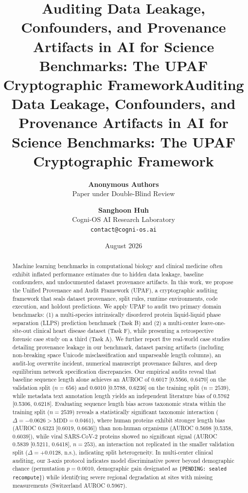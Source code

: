 \documentclass[submittal,11pt]{article}
\title{\textbf{Auditing Data Leakage, Confounders, and Provenance Artifacts in AI for Science Benchmarks: The UPAF Cryptographic Framework}}
\author{\textbf{Anonymous Authors}\\[0.5em]
  Paper under Double-Blind Review}
\title{\textbf{Auditing Data Leakage, Confounders, and Provenance Artifacts in AI for Science Benchmarks: The UPAF Cryptographic Framework}}
\author{\textbf{Sanghoon Huh}\\[0.5em]
  Cogni-OS AI Research Laboratory\\
  \texttt{contact@cogni-os.ai}}
\date{August 2026}
\begin{document}
\maketitle

\begin{abstract}
Machine learning benchmarks in computational biology and clinical medicine often exhibit inflated performance estimates due to hidden data leakage, baseline confounders, and undocumented dataset provenance artifacts. In this work, we propose the Unified Provenance and Audit Framework (UPAF), a cryptographic auditing framework that seals dataset provenance, split rules, runtime environments, code execution, and holdout predictions. We apply UPAF to audit two primary domain benchmarks: (1) a multi-species intrinsically disordered protein liquid-liquid phase separation (LLPS) prediction benchmark (Task B) and (2) a multi-center leave-one-site-out clinical heart disease dataset (Task F), while presenting a retrospective forensic case study on a third (Task A). We further report five real-world case studies detailing provenance leakage in our benchmark, dataset parsing artifacts (including non-breaking space Unicode misclassification and unparseable length columns), an audit-log overwrite incident, numerical manuscript provenance failures, and deep equilibrium network specification discrepancies. Our empirical audits reveal that baseline sequence length alone achieves an AUROC of 0.6017 [0.5566, 0.6470] on the validation split ($n=656$) and 0.6010 [0.5788, 0.6236] on the training split ($n=2539$), while metadata text annotation length yields an independent literature bias of 0.5762 [0.5306, 0.6218]. Evaluating sequence length bias across taxonomic strata within the training split ($n=2539$) reveals a statistically significant taxonomic interaction ($\Delta = -0.0626 > \text{MDD}=0.0461$), where human proteins exhibit stronger length bias (AUROC 0.6323 [0.6019, 0.6636]) than non-human organisms (AUROC 0.5698 [0.5358, 0.6039]), while viral SARS-CoV-2 proteins showed no significant signal (AUROC 0.5839 [0.5211, 0.6418], $n=253$), an interaction not replicated in the smaller validation split ($\Delta=+0.0128$, n.s.), indicating split heterogeneity. In multi-center clinical auditing, our 3-axis protocol indicates model discriminative power beyond demographic chance (permutation $p = 0.0010$, demographic gain designated as \texttt{[PENDING: sealed recompute]}) while identifying severe regional degradation at sites with missing measurements (Switzerland AUROC 0.5967).
\end{abstract}
\end{document}
